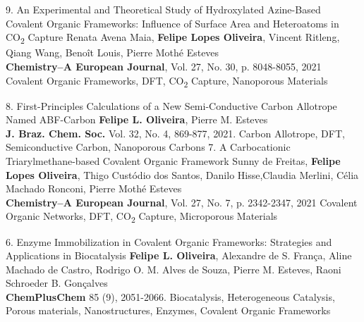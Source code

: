 %
%
%


\begin{projects}
	\project
	{9. An Experimental and Theoretical Study of Hydroxylated Azine-Based Covalent Organic Frameworks: Influence of Surface Area and Heteroatoms in CO\textsubscript{2} Capture}{}
	{Renata Avena Maia, \textbf{Felipe Lopes Oliveira}, Vincent Ritleng, Qiang Wang, Benoît Louis, Pierre Mothé Esteves\\
	\textbf{Chemistry–A European Journal}, Vol. 27, No. 30, p. 8048-8055, 2021}
	{}
	{Covalent Organic Frameworks, DFT, CO\textsubscript{2} Capture, Nanoporous Materials}
	
	\project
	{8. First-Principles Calculations of a New Semi-Conductive Carbon Allotrope Named ABF-Carbon}{}
	{\textbf{Felipe L. Oliveira}, Pierre M. Esteves\\
	\textbf{J. Braz. Chem. Soc.} Vol. 32, No. 4, 869-877, 2021.}
	{}
	{Carbon Allotrope, DFT, Semiconductive Carbon, Nanoporous Carbons}
	\project
	{7. A Carbocationic Triarylmethane-based Covalent Organic Framework}{}
	{Sunny de Freitas, \textbf{Felipe Lopes Oliveira}, Thigo Custódio dos Santos, Danilo Hisse,Claudia Merlini, Célia Machado Ronconi, Pierre Mothé Esteves\\
	\textbf{Chemistry–A European Journal}, Vol. 27, No. 7, p. 2342-2347, 2021}
	{}
	{Covalent Organic Networks, DFT, CO\textsubscript{2} Capture, Microporous Materials}
	
	\project
	{6. Enzyme Immobilization in Covalent Organic Frameworks: Strategies and Applications in Biocatalysis}{}
	{\textbf{Felipe L. Oliveira}, Alexandre de S. França, Aline Machado de Castro, Rodrigo O. M. Alves de Souza, Pierre M. Esteves, Raoni Schroeder B. Gonçalves\\
	\textbf{ChemPlusChem} 85 (9), 2051-2066.}
	{}
	{Biocatalysis, Heterogeneous Catalysis, Porous materials, Nanostructures, Enzymes, Covalent Organic Frameworks}
	

\end{projects}
